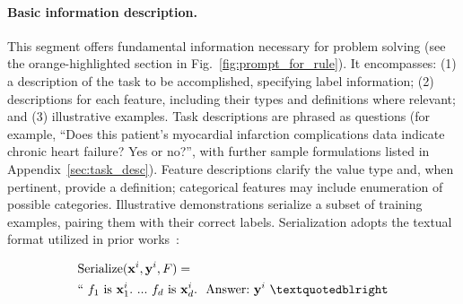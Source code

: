 \vspace*{-0.12in}
\paragraph{Basic information description.} This segment offers fundamental information necessary for problem solving (see the orange-highlighted section in Fig.~\ref{fig:prompt_for_rule}). It encompasses: (1) a description of the task to be accomplished, specifying label information; (2) descriptions for each feature, including their types and definitions where relevant; and (3) illustrative examples. Task descriptions are phrased as questions (for example, ``Does this patient's myocardial infarction complications data indicate chronic heart failure? Yes or no?'', with further sample formulations listed in Appendix~\ref{sec:task_desc}). Feature descriptions clarify the value type and, when pertinent, provide a definition; categorical features may include enumeration of possible categories. Illustrative demonstrations serialize a subset of training examples, pairing them with their correct labels. Serialization adopts the textual format utilized in prior works~\cite{dinh2022lift,hegselmann2023tabllm}:

\begin{align}
&\text{Serialize}(\mathbf{x}^i,\mathbf{y}^i, F) = \nonumber \\ 
&``\ f_1\ \text{is}\ \mathbf{x}^i_1.\ ... \ f_d\  \text{is}\  \mathbf{x}^i_d.\ \ \text{Answer:}\  \mathbf{y}^i\ ”
\end{align}

\vspace*{-0.12in}
